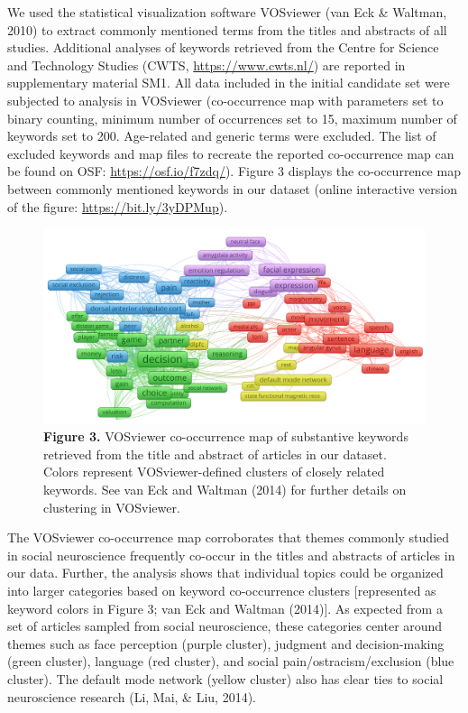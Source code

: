 \documentclass[
  man,floatsintext]{apa6}
\begin{document}
We used the statistical visualization software VOSviewer (van Eck \& Waltman, 2010) to extract commonly mentioned terms from the titles and abstracts of all studies. Additional analyses of keywords retrieved from the Centre for Science and Technology Studies (CWTS, \url{https://www.cwts.nl/}) are reported in supplementary material SM1. All data included in the initial candidate set were subjected to analysis in VOSviewer (co-occurrence map with parameters set to binary counting, minimum number of occurrences set to 15, maximum number of keywords set to 200. Age-related and generic terms were excluded. The list of excluded keywords and map files to recreate the reported co-occurrence map can be found on OSF: \url{https://osf.io/f7zdq/}). Figure 3 displays the co-occurrence map between commonly mentioned keywords in our dataset (online interactive version of the figure: \url{https://bit.ly/3yDPMup}).

\begin{figure}
\centering
\includegraphics{vosviewer_label_cooccurence.png}
\caption{\textbf{Figure 3.} VOSviewer co-occurrence map of substantive keywords retrieved from the title and abstract of articles in our dataset. Colors represent VOSviewer-defined clusters of closely related keywords. See van Eck and Waltman (2014) for further details on clustering in VOSviewer.}
\end{figure}

The VOSviewer co-occurrence map corroborates that themes commonly studied in social neuroscience frequently co-occur in the titles and abstracts of articles in our data. Further, the analysis shows that individual topics could be organized into larger categories based on keyword co-occurrence clusters {[}represented as keyword colors in Figure 3; van Eck and Waltman (2014){]}. As expected from a set of articles sampled from social neuroscience, these categories center around themes such as face perception (purple cluster), judgment and decision-making (green cluster), language (red cluster), and social pain/ostracism/exclusion (blue cluster). The default mode network (yellow cluster) also has clear ties to social neuroscience research (Li, Mai, \& Liu, 2014).
\end{document}

